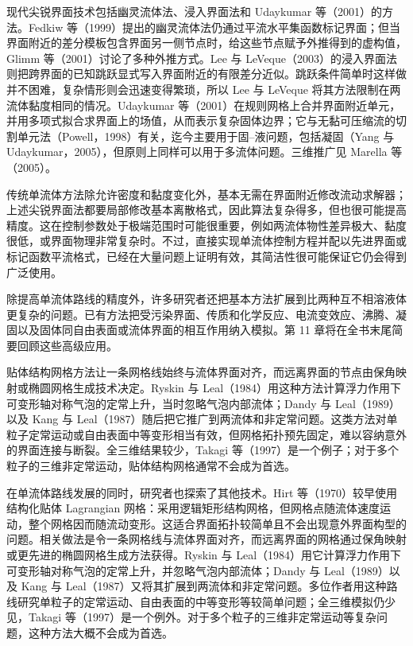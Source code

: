 \documentclass[11pt,a4paper,openany,fontset=none]{ctexbook}
\begin{document}
现代尖锐界面技术包括幽灵流体法、浸入界面法和 Udaykumar 等（2001）的方法。Fedkiw 等（1999）提出的幽灵流体法仍通过平流水平集函数标记界面；但当界面附近的差分模板包含界面另一侧节点时，给这些节点赋予外推得到的虚构值，Glimm 等（2001）讨论了多种外推方式。Lee 与 LeVeque（2003）的浸入界面法则把跨界面的已知跳跃显式写入界面附近的有限差分近似。跳跃条件简单时这样做并不困难，复杂情形则会迅速变得繁琐，所以 Lee 与 LeVeque 将其方法限制在两流体黏度相同的情况。Udaykumar 等（2001）在规则网格上合并界面附近单元，并用多项式拟合求界面上的场值，从而表示复杂固体边界；它与无黏可压缩流的切割单元法（Powell，1998）有关，迄今主要用于固--液问题，包括凝固（Yang 与 Udaykumar，2005），但原则上同样可以用于多流体问题。三维推广见 Marella 等（2005）。

传统单流体方法除允许密度和黏度变化外，基本无需在界面附近修改流动求解器；上述尖锐界面法都要局部修改基本离散格式，因此算法复杂得多，但也很可能提高精度。这在控制参数处于极端范围时可能很重要，例如两流体物性差异极大、黏度很低，或界面物理非常复杂时。不过，直接实现单流体控制方程并配以先进界面或标记函数平流格式，已经在大量问题上证明有效，其简洁性很可能保证它仍会得到广泛使用。

除提高单流体路线的精度外，许多研究者还把基本方法扩展到比两种互不相溶液体更复杂的问题。已有方法把受污染界面、传质和化学反应、电流变效应、沸腾、凝固以及固体同自由表面或流体界面的相互作用纳入模拟。第 11 章将在全书末尾简要回顾这些高级应用。

贴体结构网格方法让一条网格线始终与流体界面对齐，而远离界面的节点由保角映射或椭圆网格生成技术决定。Ryskin 与 Leal（1984）用这种方法计算浮力作用下可变形轴对称气泡的定常上升，当时忽略气泡内部流体；Dandy 与 Leal（1989）以及 Kang 与 Leal（1987）随后把它推广到两流体和非定常问题。这类方法对单粒子定常运动或自由表面中等变形相当有效，但网格拓扑预先固定，难以容纳意外的界面连接与断裂。全三维结果较少，Takagi 等（1997）是一个例子；对于多个粒子的三维非定常运动，贴体结构网格通常不会成为首选。

在单流体路线发展的同时，研究者也探索了其他技术。Hirt 等（1970）较早使用结构化贴体 Lagrangian 网格：采用逻辑矩形结构网格，但网格点随流体速度运动，整个网格因而随流动变形。这适合界面拓扑较简单且不会出现意外界面构型的问题。相关做法是令一条网格线与流体界面对齐，而远离界面的网格通过保角映射或更先进的椭圆网格生成方法获得。Ryskin 与 Leal（1984）用它计算浮力作用下可变形轴对称气泡的定常上升，并忽略气泡内部流体；Dandy 与 Leal（1989）以及 Kang 与 Leal（1987）又将其扩展到两流体和非定常问题。多位作者用这种路线研究单粒子的定常运动、自由表面的中等变形等较简单问题；全三维模拟仍少见，Takagi 等（1997）是一个例外。对于多个粒子的三维非定常运动等复杂问题，这种方法大概不会成为首选。
\end{document}
